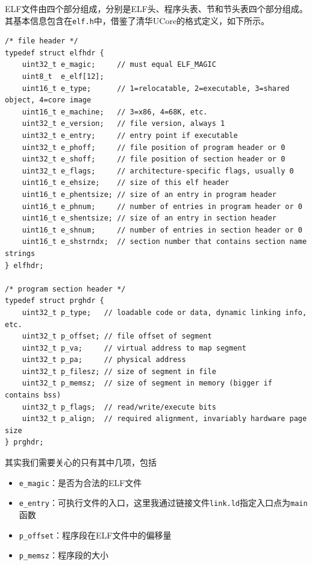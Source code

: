 \documentclass[logo,reportComp]{thesis}
\begin{document}
ELF文件由四个部分组成，分别是ELF头、程序头表、节和节头表四个部分组成。
其基本信息包含在\verb'elf.h'中，借鉴了清华UCore的格式定义，如下所示。
\begin{lstlisting}
/* file header */
typedef struct elfhdr {
    uint32_t e_magic;     // must equal ELF_MAGIC
    uint8_t  e_elf[12];
    uint16_t e_type;      // 1=relocatable, 2=executable, 3=shared object, 4=core image
    uint16_t e_machine;   // 3=x86, 4=68K, etc.
    uint32_t e_version;   // file version, always 1
    uint32_t e_entry;     // entry point if executable
    uint32_t e_phoff;     // file position of program header or 0
    uint32_t e_shoff;     // file position of section header or 0
    uint32_t e_flags;     // architecture-specific flags, usually 0
    uint16_t e_ehsize;    // size of this elf header
    uint16_t e_phentsize; // size of an entry in program header
    uint16_t e_phnum;     // number of entries in program header or 0
    uint16_t e_shentsize; // size of an entry in section header
    uint16_t e_shnum;     // number of entries in section header or 0
    uint16_t e_shstrndx;  // section number that contains section name strings
} elfhdr;

/* program section header */
typedef struct prghdr {
    uint32_t p_type;   // loadable code or data, dynamic linking info, etc.
    uint32_t p_offset; // file offset of segment
    uint32_t p_va;     // virtual address to map segment
    uint32_t p_pa;     // physical address
    uint32_t p_filesz; // size of segment in file
    uint32_t p_memsz;  // size of segment in memory (bigger if contains bss)
    uint32_t p_flags;  // read/write/execute bits
    uint32_t p_align;  // required alignment, invariably hardware page size
} prghdr;
\end{lstlisting}

其实我们需要关心的只有其中几项，包括
\begin{itemize}
	\item \verb'e_magic'：是否为合法的ELF文件
	\item \verb'e_entry'：可执行文件的入口，这里我通过链接文件\verb'link.ld'指定入口点为\verb'main'函数
	\item \verb'p_offset'：程序段在ELF文件中的偏移量
	\item \verb'p_memsz'：程序段的大小
\end{itemize}
\end{document}
